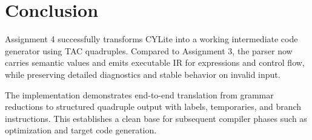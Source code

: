\documentclass[a4paper,12pt]{article}
\begin{document}
\section{Conclusion}

Assignment 4 successfully transforms CYLite into a working intermediate code generator using TAC quadruples. Compared to Assignment 3, the parser now carries semantic values and emits executable IR for expressions and control flow, while preserving detailed diagnostics and stable behavior on invalid input.

The implementation demonstrates end-to-end translation from grammar reductions to structured quadruple output with labels, temporaries, and branch instructions. This establishes a clean base for subsequent compiler phases such as optimization and target code generation.
\end{document}
